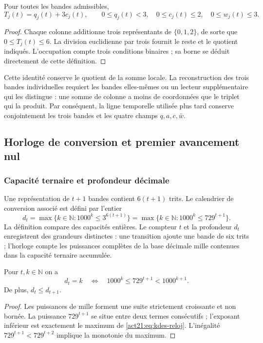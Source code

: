 \begin{proposition}
Pour toutes les bandes admissibles,
\[
 T_j(t)=q_j(t)+3c_j(t),\qquad
 0\leq q_j(t)<3,\quad 0\leq c_j(t)\leq2,
 \quad0\leq w_j(t)\leq3.
\]
\end{proposition}
\begin{proof}
Chaque colonne additionne trois représentants de $\{0,1,2\}$, de sorte que
$0\leq T_j(t)\leq6$. La division euclidienne par trois fournit le reste
et le quotient indiqués. L'occupation compte trois conditions binaires ;
sa borne se déduit directement de cette définition.
\end{proof}

Cette identité conserve le quotient de la somme locale. La reconstruction
des trois bandes individuelles requiert les bandes elles-mêmes ou un lecteur
supplémentaire qui les distingue : une somme de colonne a moins de coordonnées
que le triplet qui la produit. Par conséquent, la ligne temporelle utilisée plus
tard conserve conjointement les trois bandes et les quatre champs
$q,a,c,\bar w$.

\subsection{Horloge de conversion et premier avancement nul}

\subsubsection{Capacité ternaire et profondeur décimale}

Une représentation de $t+1$ bandes contient $6(t+1)$ trits. Le calendrier
de conversion associé est défini par l'entier
\begin{equation}
 d_t=\max\{k\in\mathbb N:1000^k\leq3^{6(t+1)}\}
     =\max\{k\in\mathbb N:1000^k\leq729^{t+1}\}.
 \label{act21:eq:kdes-reloj}
\end{equation}
La définition compare des capacités entières. Le compteur $t$ et la profondeur $d_t$ enregistrent des grandeurs distinctes : une transition ajoute une bande de six trits ; l'horloge compte les puissances complètes de la base décimale mille contenues dans la capacité ternaire accumulée.

\begin{lemma}
Pour $t,k\in\mathbb N$ on a
\[
 d_t=k\quad\Longleftrightarrow\quad
 1000^k\leq729^{t+1}<1000^{k+1}.
\]
De plus, $d_t\leq d_{t+1}$.
\end{lemma}
\begin{proof}
Les puissances de mille forment une suite strictement croissante et non bornée. La puissance $729^{t+1}$ se situe entre deux termes consécutifs ; l'exposant inférieur est exactement le maximum de \eqref{act21:eq:kdes-reloj}. L'inégalité $729^{t+1}<729^{t+2}$ implique la monotonie du maximum.
\end{proof}

